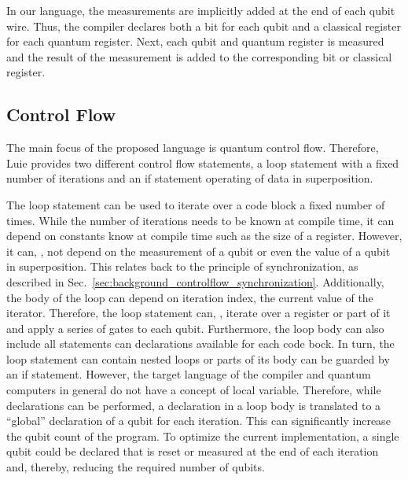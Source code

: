 In our language, the measurements are implicitly added at the end of each qubit wire. Thus, the compiler declares both a bit for each qubit and a classical register for each quantum register. Next, each qubit and quantum register is measured and the result of the measurement is added to the corresponding bit or classical register.

\subsection{Control Flow}
\label{sec:concept_controlFlow}
The main focus of the proposed language is quantum control flow. Therefore, Luie provides two different control flow statements, a loop statement with a fixed number of iterations and an if statement operating of data in superposition. 

The loop statement can be used to iterate over a code block a fixed number of times. While the number of iterations needs to be known at compile time, it can depend on constants know at compile time such as the size of a register. However, it can, \eg, not depend on the measurement of a qubit or even the value of a qubit in superposition. This relates back to the principle of synchronization, as described in Sec.~\ref{sec:background_controlflow_synchronization}. Additionally, the body of the loop can depend on iteration index, \ie the current value of the iterator. Therefore, the loop statement can, \eg, iterate over a register or part of it and apply a series of gates to each qubit. Furthermore, the loop body can also include all statements can declarations available for each code bock. In turn, the loop statement can contain nested loops or parts of its body can be guarded by an if statement. However, the target language of the compiler and quantum computers in general do not have a concept of local variable. Therefore, while declarations can be performed, a declaration in a loop body is translated to a ``global'' declaration of a qubit for each iteration. This can significantly increase the qubit count of the program. To optimize the current implementation, a single qubit could be declared that is reset or measured at the end of each iteration and, thereby, reducing the required number of qubits.

